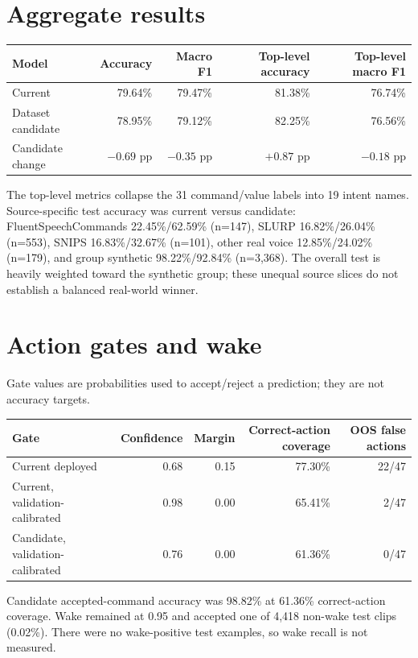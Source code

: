 \documentclass[10pt]{article}
\begin{document}
\section*{Aggregate results}
\begin{center}
\begin{tabular}{lrrrr}
\toprule
Model & Accuracy & Macro F1 & Top-level accuracy & Top-level macro F1\\
\midrule
Current & 79.64\% & 79.47\% & 81.38\% & 76.74\%\\
Dataset candidate & 78.95\% & 79.12\% & 82.25\% & 76.56\%\\
Candidate change & $-0.69$ pp & $-0.35$ pp & $+0.87$ pp & $-0.18$ pp\\
\bottomrule
\end{tabular}
\end{center}
The top-level metrics collapse the 31 command/value labels into 19 intent names. Source-specific test accuracy was current versus candidate: FluentSpeechCommands 22.45\%/62.59\% (n=147), SLURP 16.82\%/26.04\% (n=553), SNIPS 16.83\%/32.67\% (n=101), other real voice 12.85\%/24.02\% (n=179), and group synthetic 98.22\%/92.84\% (n=3,368). The overall test is heavily weighted toward the synthetic group; these unequal source slices do not establish a balanced real-world winner.

\section*{Action gates and wake}
Gate values are probabilities used to accept/reject a prediction; they are not accuracy targets.
\begin{center}
\begin{tabular}{lrrrr}
\toprule
Gate & Confidence & Margin & Correct-action coverage & OOS false actions\\
\midrule
Current deployed & 0.68 & 0.15 & 77.30\% & 22/47\\
Current, validation-calibrated & 0.98 & 0.00 & 65.41\% & 2/47\\
Candidate, validation-calibrated & 0.76 & 0.00 & 61.36\% & 0/47\\
\bottomrule
\end{tabular}
\end{center}
Candidate accepted-command accuracy was 98.82\% at 61.36\% correct-action coverage. Wake remained at 0.95 and accepted one of 4,418 non-wake test clips (0.02\%). There were no wake-positive test examples, so wake recall is not measured.
\end{document}
